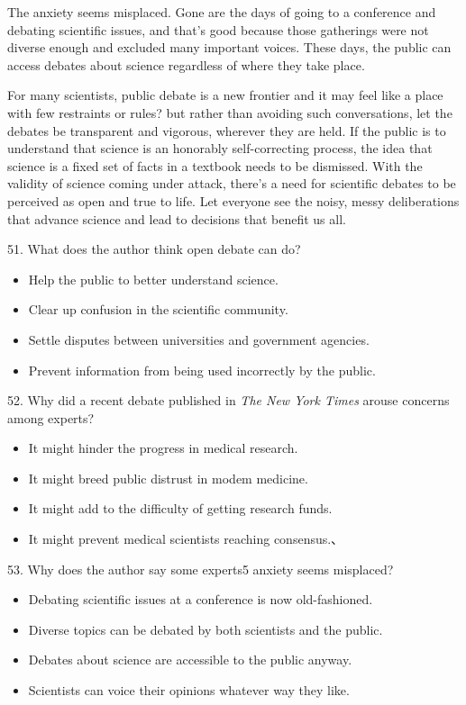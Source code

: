 \documentclass[UTF8,11pt]{ctexart}
\begin{document}
The anxiety seems misplaced. Gone are the days of going to a conference and debating scientific issues, and that's good because those gatherings were not diverse enough and excluded many important voices. These days, the public can access debates about science regardless of where they take place.


For many scientists, public debate is a new frontier and it may feel like a place with few restraints or rules? but rather than avoiding such conversations, let the debates be transparent and vigorous, wherever they are held. If the public is to understand that science is an honorably self-correcting process, the idea that science is a fixed set of facts in a textbook needs to be dismissed. With the validity of science coming under attack, there's a need for scientific debates to be perceived as open and true to life. Let everyone see the noisy, messy deliberations that advance science and lead to decisions that benefit us all.


51. What does the author think open debate can do?


\begin{itemize}[leftmargin=2em,itemsep=.2em,topsep=.4em]\item[A.] Help the public to better understand science.
\item[B.] Clear up confusion in the scientific community.
\item[C.] Settle disputes between universities and government agencies.
\item[D.] Prevent information from being used incorrectly by the public.
\end{itemize}

52. Why did a recent debate published in \textit{The New York Times} arouse concerns among experts?


\begin{itemize}[leftmargin=2em,itemsep=.2em,topsep=.4em]\item[A.] It might hinder the progress in medical research.
\item[B.] It might breed public distrust in modem medicine.
\item[C.] It might add to the difficulty of getting research funds.
\item[D.] It might prevent medical scientists reaching consensus.、
\end{itemize}

53. Why does the author say some experts5 anxiety seems misplaced?


\begin{itemize}[leftmargin=2em,itemsep=.2em,topsep=.4em]\item[A.] Debating scientific issues at a conference is now old-fashioned.
\item[B.] Diverse topics can be debated by both scientists and the public.
\item[C.] Debates about science are accessible to the public anyway.
\item[D.] Scientists can voice their opinions whatever way they like.
\end{itemize}
\end{document}
